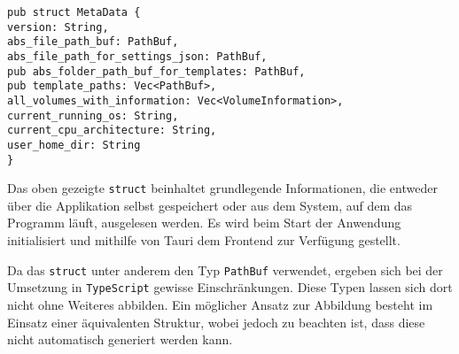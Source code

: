\begin{verbatim}
pub struct MetaData {
version: String,
abs_file_path_buf: PathBuf,
abs_file_path_for_settings_json: PathBuf,
pub abs_folder_path_buf_for_templates: PathBuf,
pub template_paths: Vec<PathBuf>,
all_volumes_with_information: Vec<VolumeInformation>,
current_running_os: String,
current_cpu_architecture: String,
user_home_dir: String
}
\end{verbatim}

Das oben gezeigte \verb|struct| beinhaltet grundlegende Informationen, die entweder über die Applikation selbst gespeichert oder
aus dem System, auf dem das Programm läuft, ausgelesen werden. Es wird beim Start der Anwendung initialisiert und mithilfe von
Tauri dem Frontend zur Verfügung gestellt.

Da das \verb|struct| unter anderem den Typ \verb|PathBuf| verwendet, ergeben sich bei der Umsetzung in \verb|TypeScript| gewisse
Einschränkungen. Diese Typen lassen sich dort nicht ohne Weiteres abbilden. Ein möglicher Ansatz zur Abbildung besteht im Einsatz
einer äquivalenten Struktur, wobei jedoch zu beachten ist, dass diese nicht automatisch generiert werden kann.


